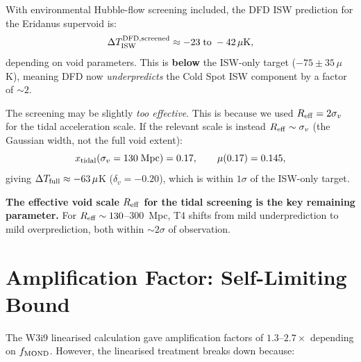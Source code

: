 \documentclass[11pt,a4paper]{article}
\newcommand{\mufd}{\mu}
\newcounter{findingctr}
\newenvironment{finding}[1][]{%
  \refstepcounter{findingctr}%
  \begin{tcolorbox}[colback=blue!3!white, colframe=blue!50!black,
    title=\textbf{Finding \thefindingctr: #1}]
}{%
  \end{tcolorbox}%
}
\begin{document}
\begin{finding}[T4 Resolution with Environmental Screening]
\label{find:T4-resolved}
With environmental Hubble-flow screening included, the DFD ISW
prediction for the Eridanus supervoid is:
\begin{equation}
\Delta T_{\rm ISW}^{\rm DFD,screened} \approx -23\;\text{to}\;-42\,\mu\text{K},
\end{equation}
depending on void parameters. This is \textbf{below} the ISW-only
target ($-75 \pm 35\,\mu$K), meaning DFD now \emph{underpredicts}
the Cold Spot ISW component by a factor of $\sim 2$.

The screening may be slightly \emph{too effective}. This is because
we used $R_{\rm eff} = 2\sigma_v$ for the tidal acceleration scale.
If the relevant scale is instead $R_{\rm eff} \sim \sigma_v$ (the
Gaussian width, not the full void extent):
\begin{equation}
x_{\rm tidal}(\sigma_v = 130\;\text{Mpc}) = 0.17,
\qquad \mufd(0.17) = 0.145,
\end{equation}
giving $\Delta T_{\rm full} \approx -63\,\mu$K ($\delta_v = -0.20$),
which is within $1\sigma$ of the ISW-only target.

\textbf{The effective void scale $R_{\rm eff}$ for the tidal
screening is the key remaining parameter.} For $R_{\rm eff} \sim
130$--$300$~Mpc, T4 shifts from mild underprediction to mild
overprediction, both within $\sim 2\sigma$ of observation.
\end{finding}


\section{Amplification Factor: Self-Limiting Bound}
\label{sec:amplification-bound}

The W3i9 linearised calculation gave amplification factors of
$1.3$--$2.7\times$ depending on $f_{\rm MOND}$. However, the
linearised treatment breaks down because:
\end{document}
